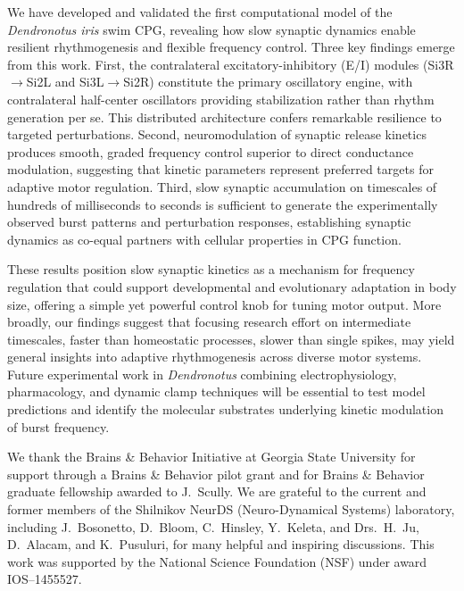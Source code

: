 \documentclass[nofootinbib,aip,amsmath,amssymb,preprint,twocolumn,floatfix,10pt]{revtex4-2}
\begin{document}
We have developed and validated the first computational model of the \textit{Dendronotus iris} swim CPG, revealing how slow synaptic dynamics enable resilient rhythmogenesis and flexible frequency control. Three key findings emerge from this work. First, the contralateral excitatory-inhibitory (E/I) modules (Si3R$\to$Si2L and Si3L$\to$Si2R) constitute the primary oscillatory engine, with contralateral half-center oscillators providing stabilization rather than rhythm generation per se. This distributed architecture confers remarkable resilience to targeted perturbations. Second, neuromodulation of synaptic release kinetics produces smooth, graded frequency control superior to direct conductance modulation, suggesting that kinetic parameters represent preferred targets for adaptive motor regulation. Third, slow synaptic accumulation on timescales of hundreds of milliseconds to seconds is sufficient to generate the experimentally observed burst patterns and perturbation responses, establishing synaptic dynamics as co-equal partners with cellular properties in CPG function.

These results position slow synaptic kinetics as a mechanism for frequency regulation that could support developmental and evolutionary adaptation in body size, offering a simple yet powerful control knob for tuning motor output. More broadly, our findings suggest that focusing research effort on intermediate timescales, faster than homeostatic processes, slower than single spikes, may yield general insights into adaptive rhythmogenesis across diverse motor systems. Future experimental work in \textit{Dendronotus} combining electrophysiology, pharmacology, and dynamic clamp techniques will be essential to test model predictions and identify the molecular substrates underlying kinetic modulation of burst frequency.

\begin{acknowledgments}
We thank the Brains \& Behavior Initiative at Georgia State University for support through a Brains \& Behavior pilot grant and for Brains \& Behavior graduate fellowship awarded to J.~Scully. We are grateful to the current and former members of the Shilnikov NeurDS (Neuro-Dynamical Systems) laboratory, including J.~Bosonetto, D.~Bloom, C.~Hinsley, Y.~Keleta, and Drs.~H.~Ju, D.~Alacam, and K.~Pusuluri, for many helpful and inspiring discussions. This work was supported by the National Science Foundation (NSF) under award  IOS--1455527.
\end{acknowledgments}
\end{document}
